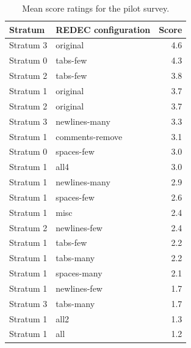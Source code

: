 \documentclass[%
class=scrreprt,
chapterprefix=false,%
open=right,%
twoside=false,%
paper=a4,%
logofile={Logo\_zentral\_farbig\_EN.png},%
thesistype=master,%
UKenglish,%
]{se2thesis}
\theoremstyle{definition}
\newcommand{\rdh}{REDEC\xspace}
\begin{document}
	
	\begin{table}[tb]
		\centering
		\caption{Mean score ratings for the pilot survey. 
		}
		\label{tab:pilot_survey_results}
		\begin{tabular}{llr}
			\toprule
			Stratum & \rdh configuration & Score \\
			\midrule
			Stratum 3 & original & 4.6 \\
			Stratum 0 & tabs-few & 4.3 \\
			Stratum 2 & tabs-few & 3.8 \\
			Stratum 1 & original & 3.7 \\
			Stratum 2 & original & 3.7 \\
			Stratum 3 & newlines-many & 3.3 \\
			Stratum 1 & comments-remove & 3.1 \\
			Stratum 0 & spaces-few & 3.0 \\
			Stratum 1 & all4 & 3.0 \\
			Stratum 1 & newlines-many & 2.9 \\
			Stratum 1 & spaces-few & 2.6 \\
			Stratum 1 & misc & 2.4 \\
			Stratum 2 & newlines-few & 2.4 \\
			Stratum 1 & tabs-few & 2.2 \\
			Stratum 1 & tabs-many & 2.2 \\
			Stratum 1 & spaces-many & 2.1 \\
			Stratum 1 & newlines-few & 1.7 \\
			Stratum 3 & tabs-many & 1.7 \\
			Stratum 1 & all2 & 1.3 \\
			Stratum 1 & all & 1.2 \\
			\bottomrule
		\end{tabular}
	\end{table}
	
\end{document}
